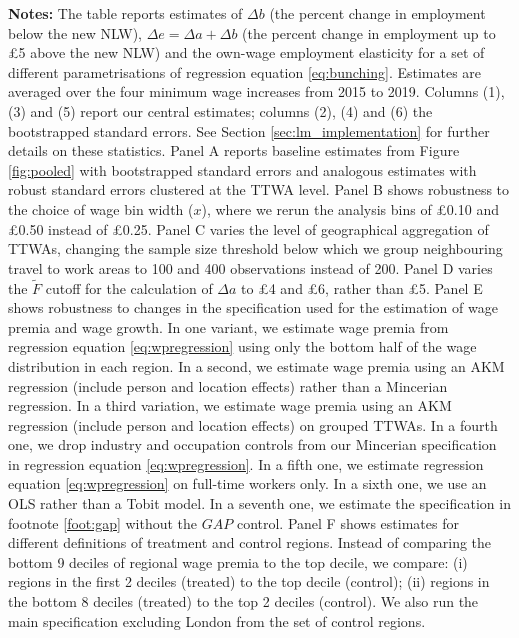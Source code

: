 \begin{table}[pth]
\begin{threeparttable}
\footnotesize{\textbf{Notes:} The table reports estimates of $\Delta b$ (the percent change in employment below the new NLW), $\Delta e = \Delta a + \Delta b$ (the percent change in employment up to \pounds 5 above the new NLW) and the own-wage employment elasticity for a set of different parametrisations of regression equation \ref{eq:bunching}. Estimates are averaged over the four minimum wage increases from 2015 to 2019. Columns (1), (3) and (5) report our central estimates; columns (2), (4) and (6) the bootstrapped standard errors. See Section \ref{sec:lm_implementation} for further details on these statistics. Panel A reports baseline estimates from Figure \ref{fig:pooled} with bootstrapped standard errors and analogous estimates with robust standard errors clustered at the TTWA level. Panel B shows robustness to the choice of wage bin width ($x$), where we rerun the analysis bins of \pounds 0.10 and \pounds 0.50 instead of \pounds 0.25. Panel C varies the level of geographical aggregation of TTWAs, changing the sample size threshold below which we group neighbouring travel to work areas to 100 and 400 observations instead of 200. Panel D varies the $\tilde{F}$ cutoff for the calculation of $\Delta{a}$ to \pounds 4 and \pounds 6, rather than \pounds 5. Panel E shows robustness to changes in the specification used for the estimation of wage premia and wage growth. In one variant, we estimate wage premia from regression equation \ref{eq:wpregression} using only the bottom half of the wage distribution in each region. In a second, we estimate wage premia using an AKM regression (include person and location effects) rather than a Mincerian regression. In a third variation, we estimate wage premia using an AKM regression (include person and location effects) on grouped TTWAs. In a fourth one, we drop industry and occupation controls from our Mincerian specification in regression equation \ref{eq:wpregression}. In a fifth one, we estimate regression equation \ref{eq:wpregression} on full-time workers only. In a sixth one, we use an OLS rather than a Tobit model. In a seventh one, we estimate the specification in footnote \ref{foot:gap} without the $GAP$ control. Panel F shows estimates for different definitions of treatment and control regions. Instead of comparing the bottom 9 deciles of regional wage premia to the top decile, we compare: (i) regions in the first 2 deciles (treated) to the top decile (control); (ii) regions in the bottom 8 deciles (treated) to the top 2 deciles (control). We also run the main specification excluding London from the set of control regions.}
\end{threeparttable}
\end{table}




